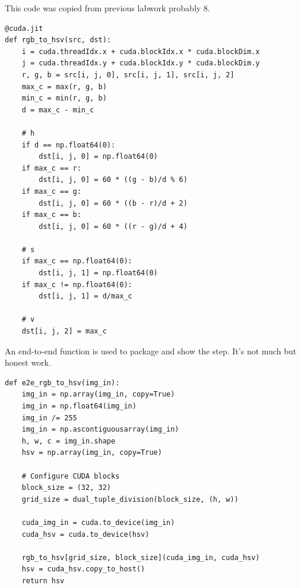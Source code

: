 \documentclass{article}
\begin{document}
This code was copied from previous labwork probably 8.
\begin{verbatim}
@cuda.jit
def rgb_to_hsv(src, dst):
    i = cuda.threadIdx.x + cuda.blockIdx.x * cuda.blockDim.x
    j = cuda.threadIdx.y + cuda.blockIdx.y * cuda.blockDim.y
    r, g, b = src[i, j, 0], src[i, j, 1], src[i, j, 2]
    max_c = max(r, g, b)
    min_c = min(r, g, b)
    d = max_c - min_c
    
    # h
    if d == np.float64(0):
        dst[i, j, 0] = np.float64(0)
    if max_c == r:
        dst[i, j, 0] = 60 * ((g - b)/d % 6)
    if max_c == g:
        dst[i, j, 0] = 60 * ((b - r)/d + 2)
    if max_c == b:
        dst[i, j, 0] = 60 * ((r - g)/d + 4)
    
    # s
    if max_c == np.float64(0):
        dst[i, j, 1] = np.float64(0)
    if max_c != np.float64(0):
        dst[i, j, 1] = d/max_c
        
    # v
    dst[i, j, 2] = max_c
\end{verbatim}

An end-to-end function is used to package and show the step. It's not much but honest work.

\begin{verbatim}
def e2e_rgb_to_hsv(img_in):
    img_in = np.array(img_in, copy=True)
    img_in = np.float64(img_in)
    img_in /= 255
    img_in = np.ascontiguousarray(img_in)
    h, w, c = img_in.shape
    hsv = np.array(img_in, copy=True)

    # Configure CUDA blocks
    block_size = (32, 32)
    grid_size = dual_tuple_division(block_size, (h, w))
    
    cuda_img_in = cuda.to_device(img_in)
    cuda_hsv = cuda.to_device(hsv)
    
    rgb_to_hsv[grid_size, block_size](cuda_img_in, cuda_hsv)
    hsv = cuda_hsv.copy_to_host()
    return hsv
\end{verbatim}
\end{document}
